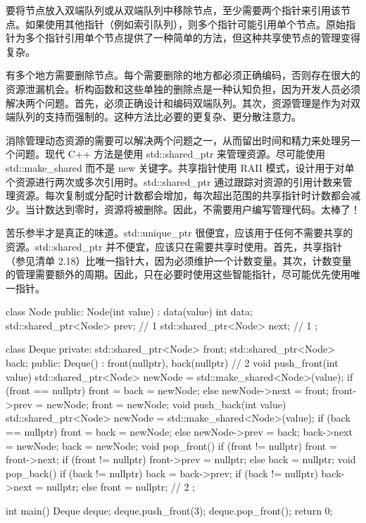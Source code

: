 要将节点放入双端队列或从双端队列中移除节点，至少需要两个指针来引用该节点。如果使用其他指针（例如索引队列），则多个指针可能引用单个节点。原始指针为多个指针引用单个节点提供了一种简单的方法，但这种共享使节点的管理变得复杂。

有多个地方需要删除节点。每个需要删除的地方都必须正确编码，否则存在很大的资源泄漏机会。析构函数和这些单独的删除点是一种认知负担，因为开发人员必须解决两个问题。首先，必须正确设计和编码双端队列。其次，资源管理是作为对双端队列的支持而强制的。这种方法比必要的更复杂、更分散注意力。


消除管理动态资源的需要可以解决两个问题之一，从而留出时间和精力来处理另一个问题。现代 C++ 方法是使用 std::shared\_ptr 来管理资源。尽可能使用 std::make\_shared 而不是 new 关键字。共享指针使用 RAII 模式，设计用于对单个资源进行两次或多次引用时。std::shared\_ptr 通过跟踪对资源的引用计数来管理资源。每次复制或分配时计数都会增加，每次超出范围的共享指针时计数都会减少。当计数达到零时，资源将被删除。因此，不需要用户编写管理代码。太棒了！

苦乐参半才是真正的味道。std::unique\_ptr 很便宜，应该用于任何不需要共享的资源。std::shared\_ptr 并不便宜，应该只在需要共享时使用。首先，共享指针（参见清单 2.18）比唯一指针大，因为必须维护一个计数变量。其次，计数变量的管理需要额外的周期。因此，只在必要时使用这些智能指针，尽可能优先使用唯一指针。


\begin{cpp}
class Node {
public:
  Node(int value) : data(value) {}
  int data;
  std::shared_ptr<Node> prev; // 1
  std::shared_ptr<Node> next; // 1
};

class Deque {
private:
  std::shared_ptr<Node> front;
  std::shared_ptr<Node> back;
public:
  Deque() : front(nullptr), back(nullptr) {} // 2
  void push_front(int value) {
    std::shared_ptr<Node> newNode = std::make_shared<Node>(value);
    if (front == nullptr)
      front = back = newNode;
    else {
      newNode->next = front;
      front->prev = newNode;
      front = newNode;
    }
  }
  void push_back(int value) {
    std::shared_ptr<Node> newNode = std::make_shared<Node>(value);
    if (back == nullptr)
      front = back = newNode;
    else {
      newNode->prev = back;
      back->next = newNode;
      back = newNode;
    }
  }
  void pop_front() {
    if (front != nullptr) {
      front = front->next;
    if (front != nullptr)
      front->prev = nullptr;
    else
      back = nullptr;
    }
  }
  void pop_back() {
    if (back != nullptr) {
      back = back->prev;
      if (back != nullptr)
        back->next = nullptr;
      else
        front = nullptr;
    } // 2
  }
};

int main() {
  Deque deque;
  deque.push_front(3);
  deque.pop_front();
  return 0;
}
\end{cpp}

